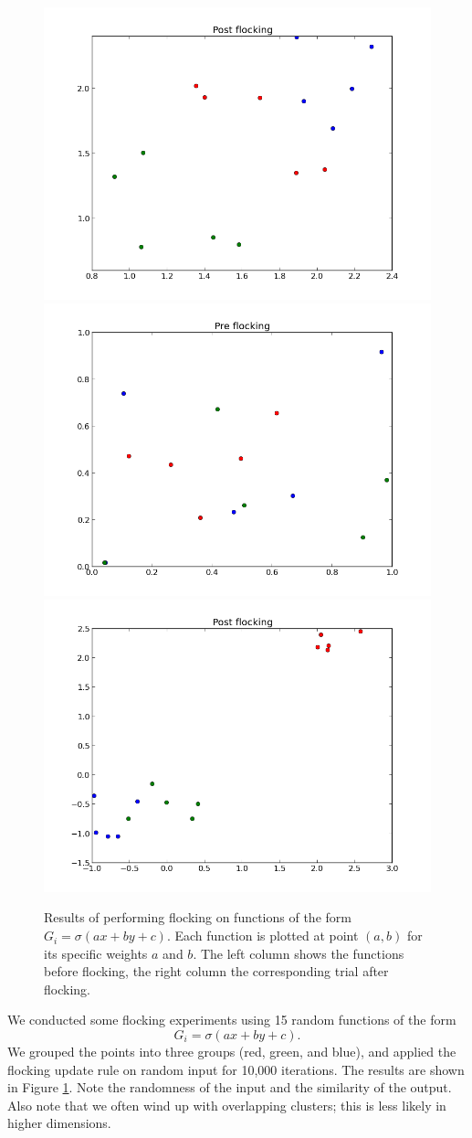 \documentclass{article}
\theoremstyle{definition}
\begin{document}
\begin{figure}
\includegraphics[width=0.5\linewidth]{flock_points_post3.png}
\includegraphics[width=0.5\linewidth]{flock_points_pre4.png}
\includegraphics[width=0.5\linewidth]{flock_points_post4.png}\\
\caption{Results of performing flocking on functions of the form
  $G_i=\sigma(ax + by +c)$. Each function is plotted at point $(a,b)$
  for its specific weights $a$ and $b$. The left column shows the
  functions before flocking, the right column the corresponding trial
  after flocking. }
\label{fig-flocking-experiment}
\end{figure}

We conducted some flocking experiments using 15 random functions of
the form
$$G_i=\sigma(ax + by + c).$$ We grouped the points into three groups
(red, green, and blue), and applied the flocking update rule on random
input for 10,000 iterations. The results are shown in Figure
\ref{fig-flocking-experiment}.  Note the randomness of the input and
the similarity of the output. Also note that we often wind up with
overlapping clusters; this is less likely in higher dimensions.
\end{document}
